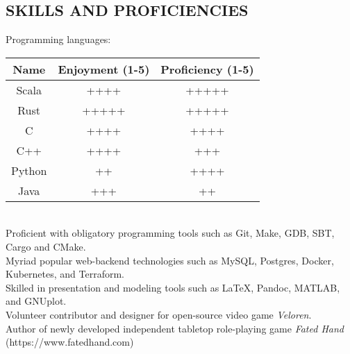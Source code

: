 \documentclass[10pt]{res}
\begin{document}
\begin{resume}
\begin{comment}
                             \>West Lafayette, IN
   \end{tabbing}\vspace{-20pt}      %
	Led the development of Android application in volunteer capacity for Purdue EPICS team in Fall Semester 2017. Noticed client need for phone software, proposed the idea, and wrote all code myself
	using the Android SDK. Worked collaboratively to test and deliver new software before semester's end, and to document program architecture and user manual. The ATG
	application is a location-aware voice guide designed to assist visually-impaired students in campus navigation.
	\vspace{-10pt}\begin{tabbing}
   \hspace{2.3in}\= \hspace{2.6in}\= \kill %
    {\bf Assistant} \>Mid-America Homes \>Summers 2016 - 2017 \\
                             \>Noblesville, IN
   \end{tabbing}\vspace{-20pt}      %
	Worked as assistant to owner of construction/remodeling business. 
	Cleared wreckage, removed damaged furniture and appliances, repaired electrical wiring, replaced plumbing. 
	Managed a small number of sub-contractors and prepared materials invoices and shipment orders. 
\end{comment}
\vspace{-10pt}\section{SKILLS AND PROFICIENCIES}          
  Programming languages:\\
  \begin{tabular}{c | c | c}
    \hline
    Name & Enjoyment (1-5) & Proficiency (1-5) \\\hline
    Scala & ++++ & +++++ \\
    Rust & +++++ & +++++ \\
    C & ++++ & ++++ \\
    C++ & ++++ & +++ \\
    Python & ++ & ++++ \\
    Java & +++ & ++ \\
    \hline
  \end{tabular}\\
	Proficient with obligatory programming tools such as Git, Make, GDB, SBT, Cargo and CMake. \\
   Myriad popular web-backend technologies such as MySQL, Postgres, Docker, Kubernetes, and Terraform.\\
	Skilled in presentation and modeling tools such as \LaTeX, Pandoc, MATLAB, and GNUplot. \\
	Volunteer contributor and designer for open-source video game \emph{Veloren}. \\
	Author of newly developed independent tabletop role-playing game \emph{Fated Hand} (https://www.fatedhand.com)
 

\end{resume}
\end{document}
